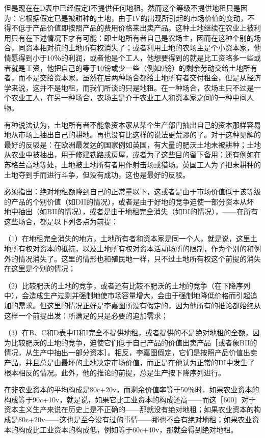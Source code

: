 但是现在在D表中已经假定I不提供任何地租。然而这个等级不提供地租只是因为：它根据假定已是被耕种的土地，由于IV的出现所引起的市场价值的变动，不得不低于产品价值即按照产品的费用价格来出卖产品。这种土地继续在农业上被利用只有在下述情况下才有可能：即土地所有者自己是农场主，因而在这种个别的场合，同资本相对抗的土地所有权消失了；或者利用土地的农场主是个小资本家，他情愿得到小于10％的利润，或者他是个工人，他想要得到的就是比工资略多一些或者就是工资，他把自己的等于10镑或少一些（例如9镑）的剩余劳动交给土地所有者，而不是交给资本家。虽然在后两种场合都给土地所有者交付租金，但是从经济学来说，这并不是地租，而我们所谈的只是地租。在一种场合，农场主只不过是一个农业工人，在另一种场合，农场主是介于农业工人和资本家之间的一种中间人物。

有种说法认为，土地所有者不能象资本家从某个生产部门抽出自己的资本那样容易地从市场上抽出自己的耕地。再也没有比这样的说法更荒谬的了。对于这种见解的最好的反驳是：在欧洲最发达的国家例如英国，有大量的肥沃土地未被耕种；土地从农业中被抽出，用于修建铁路或房屋，或者为了这些目的留下备用；还有例如在苏格兰高地等处，土地被土地所有者用作射击场或猎场。英国工人为了把未耕种的土地夺到手而进行斗争，但没有成功，这也是最好的反驳。

必须指出：绝对地租额降到自己的正常量以下，这或者是由于市场价值低于该等级的产品的个别价值（如DII的情况），或者是由于好地的竞争迫使一部分资本从坏地中抽出（如BII的情况），或者是由于地租完全消失（如DI的情况），——在所有这些场合，都是以下列各点为前提：

（1）在地租完全消失的地方，土地所有者和资本家是同一个人，就是说，这里土地所有权对资本的抵抗，以及土地所有权对资本活动场所的限制，作为个别的和例外的情况消失了。这里的情形也和殖民地一样，只不过土地所有权这个前提的消失在这里是个别的情况；

（2）比较肥沃的土地的竞争，或者还有比较不肥沃的土地的竞争（在下降序列中），会造成生产过剩并强制地使市场容量增大，会由于强制地降低价格而引起追加的需求。但这里的情况正好是李嘉图所没有假定的，因为他所有的推论都始终从这样一个前提出发：所满足的只是必要的追加需求；

（3）在B、C和D表中II和I完全不提供地租，或者提供的不是绝对地租的全额，因为比较肥沃的土地的竞争，迫使它们低于自己产品的价值出卖产品［或者象BII的情况，从生产中抽出一部分资本］。相反，李嘉图假定，它们是按照产品价值出卖产品，并且总是由最坏的土地决定市场价值，而正是在他认为正常的DI中发生了根本相反的情况。此外，他的推论的前提，总是生产按下降序列进行。

在非农业资本的平均构成是80c+20v，而剩余价值率等于50％时，如果农业资本的构成等于90c+10v，就是说，如果它比工业资本的构成还高——而这［600］对于资本主义生产来说在历史上是不正确的——那就没有绝对地租；如果农业资本的构成是80c+20v——这也是至今没有过的事情——那也不会有绝对地租；如果农业资本的构成比工业资本的构成低，例如等于60c+40v，那就会得到绝对地租。

